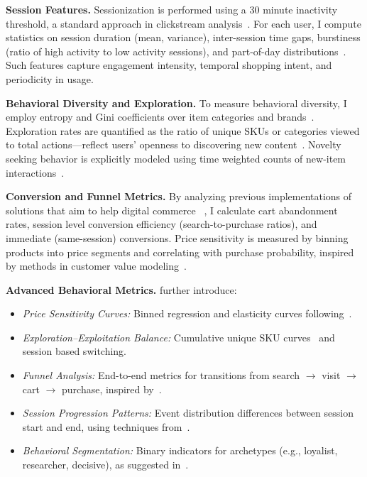 \documentclass[sigconf]{acmart}
\begin{document}
\textbf{Session Features.}
Sessionization is performed using a 30 minute inactivity threshold, a standard approach in clickstream analysis~\cite{Yang2020, Quadrana2017}. For each user, I compute statistics on session duration (mean, variance), inter-session time gaps, burstiness (ratio of high activity to low activity sessions), and part-of-day distributions~\cite{Christoffel2022}. Such features capture engagement intensity, temporal shopping intent, and periodicity in usage.

\textbf{Behavioral Diversity and Exploration.}
To measure behavioral diversity, I employ entropy and Gini coefficients over item categories and brands~\cite{Rendle2010}. Exploration rates are quantified as the ratio of unique SKUs or categories viewed to total actions—reflect users’ openness to discovering new content~\cite{Cui2018}. Novelty seeking behavior is explicitly modeled using time weighted counts of new-item interactions~\cite{Zhao2019}.

\textbf{Conversion and Funnel Metrics.}
By analyzing  previous implementations of solutions that aim to help digital commerce ~\cite{Covington2016, Zhou2020S3Rec}, I calculate cart abandonment rates, session level conversion efficiency (search-to-purchase ratios), and immediate (same-session) conversions. Price sensitivity is measured by binning products into price segments and correlating with purchase probability, inspired by methods in customer value modeling~\cite{Krasnova2018}.

\textbf{Advanced Behavioral Metrics.}
further introduce:
\begin{itemize}
    \item \textit{Price Sensitivity Curves:} Binned regression and elasticity curves following~\cite{Krasnova2018}.
    \item \textit{Exploration–Exploitation Balance:} Cumulative unique SKU curves~\cite{Cui2018} and session based switching.
    \item \textit{Funnel Analysis:} End-to-end metrics for transitions from search $\rightarrow$ visit $\rightarrow$ cart $\rightarrow$ purchase, inspired by~\cite{Covington2016}.
    \item \textit{Session Progression Patterns:} Event distribution differences between session start and end, using techniques from~\cite{Quadrana2017}.
    \item \textit{Behavioral Segmentation:} Binary indicators for archetypes (e.g., loyalist, researcher, decisive), as suggested in~\cite{Christoffel2022}.
\end{itemize}
\end{document}
